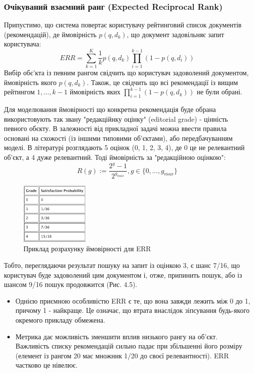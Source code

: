 \subsubsection{Очікуваний взаємний ранг (Expected Reciprocal Rank)}
Припустимо, що система повертає користувачу рейтинговий список документів (рекомендацій), де ймовірність $p(q, d_{k})$, що документ задовільняє запит користувача:
\[ERR = \sum_{k=1}^{K}\frac{1}{k}p(q, d_{k}) \prod_{i=1}^{k-1}(1-p(q, d_{i}))  \]
Вибір обє’кта із певним рангом свідчить що користувач задоволений документом, ймовірність якого $p(q, d_{k})$. Також, це свідчить що всі рекомендації із вищим рейтингом  $1, ... ,k-1$ ймовірність яких $\prod_{i=1}^{k-1}(1 - p(q, d_{k}))$ не були обрані.

Для моделювання ймовірності що конкретна рекомендація буде обрана використовують так звану "редакційнку оцінку" (editorial grade) - цінність певного обєкту. В залежності від прикладної задачі можна ввести правила основані на схожості (із іншими типовими об’єктами), або передбачуванням моделі. В літературі розглядають 5 оцінок (0, 1, 2, 3, 4), де 0 це не релевантний об’єкт, а 4 дуже релевантний.
Тоді ймовірність за "редакційною оцінкою":
\[R(g):=\frac{2^{g}-1}{2^{g_{max}}}, g \in \{0, ..., g_{max}\}\]

\begin{figure}
    \centering
    \includegraphics*[width=0.3\textwidth]{images/edit_grade_prob_sample.png}
    \caption{Приклад розрахунку ймовірності для ERR}
\end{figure}

Тобто, переглядаючи результат пошуку на запит із оцінкою 3, є шанс 7/16, що користувач буде задоволений цим документом і, отже, припинить пошук, або із шансом 9/16 пошук продовжится (Рис. 4.5).

\begin{itemize}
    \item Однією приємною особливістю ERR є те, що вона завжди лежить між 0 до 1, причому 1 - найкраще. Це означає, що втрата внаслідок зіпсування будь-якого окремого прикладу обмежена.
    \item Метрика дає можливість зменшити вплив низького рангу на об’єкт. Важливість списку рекомендацій сильно падає при збільшенні його розміру (елемент із рангом 20 має множник 1/20 до своєї релевантності). ERR частково це нівелює.
\end{itemize}

